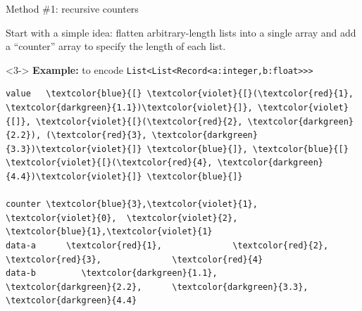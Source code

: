 \documentclass{beamer}
\begin{document}
\begin{frame}[fragile]{Method \#1: recursive counters}
\vspace{0.5 cm}

Start with a simple idea: flatten arbitrary-length lists into a single array and add a ``counter'' array to specify the length of each list.

\vspace{0.5 cm}

\vspace{0.5 cm}
\begin{uncoverenv}<3->
{\bf Example:} to encode {\tt\footnotesize List<List<Record<a:integer,b:float>>>}

\scriptsize\bf
\begin{Verbatim}[commandchars=\\\{\}]
value   \textcolor{blue}{[} \textcolor{violet}{[}(\textcolor{red}{1}, \textcolor{darkgreen}{1.1})\textcolor{violet}{]}, \textcolor{violet}{[]}, \textcolor{violet}{[}(\textcolor{red}{2}, \textcolor{darkgreen}{2.2}), (\textcolor{red}{3}, \textcolor{darkgreen}{3.3})\textcolor{violet}{]} \textcolor{blue}{]}, \textcolor{blue}{[} \textcolor{violet}{[}(\textcolor{red}{4}, \textcolor{darkgreen}{4.4})\textcolor{violet}{]} \textcolor{blue}{]}

counter \textcolor{blue}{3},\textcolor{violet}{1},          \textcolor{violet}{0},  \textcolor{violet}{2},                      \textcolor{blue}{1},\textcolor{violet}{1}
data-a      \textcolor{red}{1},              \textcolor{red}{2},        \textcolor{red}{3},              \textcolor{red}{4}
data-b         \textcolor{darkgreen}{1.1},            \textcolor{darkgreen}{2.2},      \textcolor{darkgreen}{3.3},            \textcolor{darkgreen}{4.4}
\end{Verbatim}
\end{uncoverenv}

\vspace{0.3 cm}
\end{frame}
\end{document}
